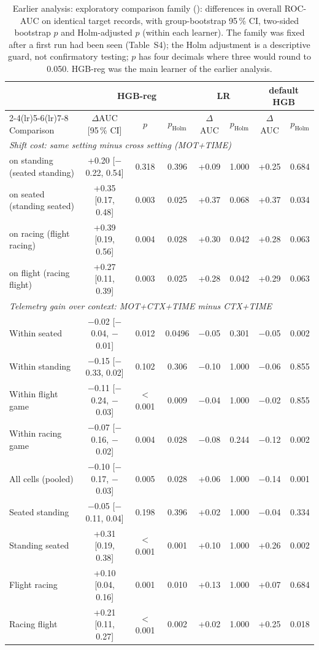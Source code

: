 \begin{table}[t]
\centering
\footnotesize
\caption{Earlier analysis: exploratory comparison family (\sevtwo{}): differences in overall ROC-AUC on identical target records, with group-bootstrap 95\,\% CI, two-sided bootstrap $p$ and Holm-adjusted $p$ (within each learner). The family was fixed after a first run had been seen (Table~S4); the Holm adjustment is a descriptive guard, not confirmatory testing; $p$ has four decimals where three would round to 0.050. HGB-reg was the main learner of the earlier analysis.}
\label{tab:supp_tests}
\setlength{\tabcolsep}{3pt}
\begin{tabular}{@{}lccccccc@{}}
\toprule
 & \multicolumn{3}{c}{HGB-reg} & \multicolumn{2}{c}{LR} & \multicolumn{2}{c}{default HGB} \\ \cmidrule(lr){2-4}\cmidrule(lr){5-6}\cmidrule(lr){7-8}
Comparison & $\Delta$AUC [95\,\% CI] & $p$ & $p_\mathrm{Holm}$ & $\Delta$AUC & $p_\mathrm{Holm}$ & $\Delta$AUC & $p_\mathrm{Holm}$ \\
\midrule
\multicolumn{8}{l}{\emph{Shift cost: same setting minus cross setting (MOT+TIME)}} \\
on standing (seated \ra{} standing) & +0.20 [$-$0.22, 0.54] & 0.318 & 0.396 & +0.09 & 1.000 & +0.25 & 0.684 \\
on seated (standing \ra{} seated) & +0.35 [0.17, 0.48] & 0.003 & 0.025 & +0.37 & 0.068 & +0.37 & 0.034 \\
on racing (flight \ra{} racing) & +0.39 [0.19, 0.56] & 0.004 & 0.028 & +0.30 & 0.042 & +0.28 & 0.063 \\
on flight (racing \ra{} flight) & +0.27 [0.11, 0.39] & 0.003 & 0.025 & +0.28 & 0.042 & +0.29 & 0.063 \\
\multicolumn{8}{l}{\emph{Telemetry gain over context: MOT+CTX+TIME minus CTX+TIME}} \\
Within seated & $-$0.02 [$-$0.04, $-$0.01] & 0.012 & 0.0496 & $-$0.05 & 0.301 & $-$0.05 & 0.002 \\
Within standing & $-$0.15 [$-$0.33, 0.02] & 0.102 & 0.306 & $-$0.10 & 1.000 & $-$0.06 & 0.855 \\
Within flight game & $-$0.11 [$-$0.24, $-$0.03] & $<$0.001 & 0.009 & $-$0.04 & 1.000 & $-$0.02 & 0.855 \\
Within racing game & $-$0.07 [$-$0.16, $-$0.02] & 0.004 & 0.028 & $-$0.08 & 0.244 & $-$0.12 & 0.002 \\
All cells (pooled) & $-$0.10 [$-$0.17, $-$0.03] & 0.005 & 0.028 & +0.06 & 1.000 & $-$0.14 & 0.001 \\
Seated \ra{} standing & $-$0.05 [$-$0.11, 0.04] & 0.198 & 0.396 & +0.02 & 1.000 & $-$0.04 & 0.334 \\
Standing \ra{} seated & +0.31 [0.19, 0.38] & $<$0.001 & 0.001 & +0.10 & 1.000 & +0.26 & 0.002 \\
Flight \ra{} racing & +0.10 [0.04, 0.16] & 0.001 & 0.010 & +0.13 & 1.000 & +0.07 & 0.684 \\
Racing \ra{} flight & +0.21 [0.11, 0.27] & $<$0.001 & 0.002 & +0.02 & 1.000 & +0.25 & 0.018 \\
\bottomrule
\end{tabular}
\end{table}